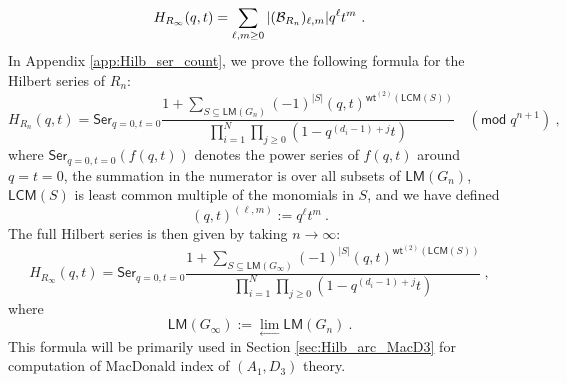 \documentclass[a4paper,10pt]{article}
\newcommand{\mr}[1]{\mathsf{#1}}
\def\CB{{\cal B}}
\def\CB {{\cal B}}
\begin{document}
\begin{equation}
H_{R_{\infty}}(q, t)=\sum_{\ell, m \geq 0} |(\CB_{R_n})_{\ell,m}| q^{\ell} t^m~.
\end{equation}
In Appendix \ref{app:Hilb_ser_count}, we prove the following formula for the Hilbert series of $R_n$: 
\begin{equation}
\label{eq: hilbert_ser_Rn_gen}
H_{R_n}(q,t) = \mr{Ser}_{q=0,t=0}\frac{1+\sum_{S\subseteq \mr{LM}(G_n)}(-1)^{|S|}(q,t)^{\mr{wt}^{(2)}(\mr{LCM}(S))}}{\prod_{i=1}^N\prod_{j\geq 0}\left(1-q^{(d_i-1)+j}t\right)} \quad (\mr{mod} \;q^{n+1})~,
\end{equation}
where $\mr{Ser}_{q=0,t=0}(f(q,t))$ denotes the power series of $f(q,t)$ around $q=t=0$, the summation in the numerator is over all subsets of $\mr{LM}(G_n)$, $\mr{LCM}(S)$ is least common multiple of the monomials in $S$, and we have defined
\begin{equation}
(q,t)^{(\ell,m)} := q^{\ell} t^m ~.   
\end{equation}
The full Hilbert series is then given by taking $n\to \infty$:
\begin{equation}
\label{eq: hilbert_ser_Rinfty_gen}
H_{R_\infty}(q,t) = \mr{Ser}_{q=0,t=0}\frac{1+\sum_{S\subseteq \mr{LM}(G_\infty)}(-1)^{|S|}(q,t)^{\mr{wt}^{(2)}(\mr{LCM}(S))}}{\prod_{i=1}^N\prod_{j\geq 0}\left(1-q^{(d_i-1)+j}t\right)}~,
\end{equation}
where 
\begin{equation}
    \mr{LM}(G_\infty):=\lim _{\leftarrow } \mr{LM}(G_n)~.
\end{equation}
This formula will be primarily used in Section \ref{sec:Hilb_arc_MacD3} for computation of MacDonald index of $(A_1,D_3)$ theory. 
\end{document}
